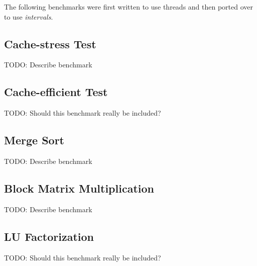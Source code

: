 The following benchmarks were first written to use threads and then
ported over to use \emph{intervals}.

\subsection*{Cache-stress Test}

TODO: Describe benchmark

\subsection*{Cache-efficient Test}

TODO: Should this benchmark really be included?

\subsection*{Merge Sort}

TODO: Describe benchmark

\subsection*{Block Matrix Multiplication}

TODO: Describe benchmark

\subsection*{LU Factorization}

TODO: Should this benchmark really be included?


